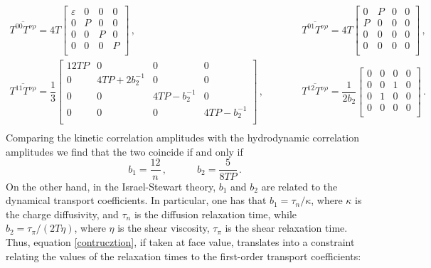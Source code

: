 \documentclass[aps,prd,preprint,nofootinbib,amsmath,amssymb,showpacs,longbibliography,singlecolumn,superscriptaddress,10pt]{revtex4-1}
\theoremstyle{plain}
\theoremstyle{definition}
\begin{document}
\begin{equation}
\begin{split}
    \overline{T^{00} T^{\nu \rho}}=4T
    \begin{bmatrix}
\varepsilon & 0 & 0 & 0 \\
0 & P & 0 & 0 \\
0 & 0 & P & 0 \\
0 & 0 & 0 & P \\
    \end{bmatrix} \, , & \quad \quad \quad 
    \overline{T^{01} T^{\nu \rho}}=4T
    \begin{bmatrix}
0 & P & 0 & 0 \\
P & 0 & 0 & 0 \\
0 & 0 & 0 & 0 \\
0 & 0 & 0 & 0 \\
    \end{bmatrix} \, , \\ 
\overline{T^{11} T^{\nu \rho}}=\dfrac{1}{3}
    \begin{bmatrix}
12TP & 0 & 0 & 0 \\
0 & 4TP{+}2b_2^{-1} & 0 & 0 \\
0 & 0 & 4TP{-}b_2^{-1} & 0 \\
0 & 0 & 0 & 4TP{-}b_2^{-1} \\
    \end{bmatrix} \, , & \quad \quad \quad 
    \overline{T^{12} T^{\nu \rho}}=\dfrac{1}{2b_2}
    \begin{bmatrix}
0 & 0 & 0 & 0 \\
0 & 0 & 1 & 0 \\
0 & 1 & 0 & 0 \\
0 & 0 & 0 & 0 \\
    \end{bmatrix} \, . \\ 
    \end{split}
\end{equation}
Comparing the kinetic correlation amplitudes with the hydrodynamic correlation amplitudes we find that the two coincide if and only if
\begin{equation}\label{contrucztion}
    b_1=\dfrac{12}{n} \, , \quad \quad \quad b_2 = \dfrac{5}{8TP} \, .
\end{equation}
On the other hand, in the Israel-Stewart theory, $b_1$ and $b_2$ are related to the dynamical transport coefficients. In particular, one has that $b_1=\tau_n/\kappa$, where $\kappa$ is the charge diffusivity, and $\tau_n$ is the diffusion relaxation time, while $b_2=\tau_\pi/(2T\eta)$, where $\eta$ is the shear viscosity, $\tau_\pi$ is the shear relaxation time. Thus, equation \eqref{contrucztion}, if taken at face value, translates into a constraint relating the values of the relaxation times to the first-order transport coefficients:
\end{document}

